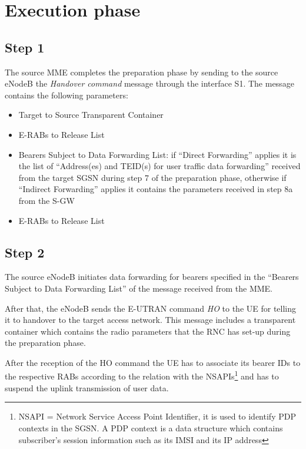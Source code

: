 \section{Execution phase}



\subsection*{Step 1}
The source MME completes the preparation phase by sending to the source eNodeB
the \emph{Handover command} message through the interface S1. The message
contains the following parameters:
\begin{itemize}
    \item Target to Source Transparent Container
    \item E-RABs to Release List
    \item Bearers Subject to Data Forwarding List: if ``Direct
    Forwarding'' applies it is the list of ``Address(es) and TEID(s) for user
    traffic data forwarding'' received from the target SGSN during step 7
    of the preparation phase, otherwise if ``Indirect Forwarding'' applies
    it contains the parameters received in step 8a from the S-GW
    \item E-RABs to Release List
\end{itemize}




\subsection*{Step 2}
The source eNodeB initiates data forwarding for bearers specified in the
``Bearers Subject to Data Forwarding List'' of the message received from the MME.

After that, the eNodeB sends the E-UTRAN command \emph{HO} to the UE for telling
it to handover to the target access network. This message includes a transparent
container which contains the radio parameters that the RNC has set-up during the
preparation phase.

After the reception of the HO command the UE has to associate its bearer IDs to
the respective RABs according to the relation with the NSAPIs\footnote{NSAPI =
Network Service Access Point Identifier, it is used to identify PDP contexts in
the SGSN. A PDP context is a data structure which contains subscriber's session
information such as its IMSI and its IP address} and has to suspend
the uplink transmission of user data.



